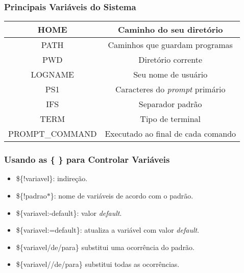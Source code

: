 \documentclass{beamer}
\begin{document}
   \begin{frame}
      \frametitle{Principais Variáveis do Sistema}
      \begin{table}
         \begin{tabular}{c|c}
         HOME  & Caminho do seu diretório\\
         \hline
         PATH  & Caminhos que guardam programas\\
         \hline 
         PWD  & Diretório corrente\\
         \hline
         LOGNAME & Seu nome de usuário \\
         \hline 
         PS1  & Caracteres do \textit{prompt} primário\\
         \hline 
         IFS  & Separador padrão\\
         \hline 
         TERM  & Tipo de terminal \\
         \hline 
	      PROMPT\_COMMAND & Executado ao final de cada comando \\
         \end{tabular}
      \end{table}
   \end{frame}


   \begin{frame}
      \frametitle{Usando as \{ \} para Controlar Variáveis}
      \begin{itemize}
         \item \$\{!variavel\}: indireção.
	      \item \$\{!padrao$*$\}: nome de variáveis de acordo com o padrão.
	      \item \$\{variavel:-default\}: valor \textit{default}.
	      \item \$\{variavel:=default\}: atualiza a variável com valor \textit{default}.
         \item \$\{variavel\slash de\slash para\} substitui uma ocorrência do padrão.
         \item \$\{variavel\slash\slash de\slash para\} substitui todas as ocorrências.
      \end{itemize}
   \end{frame}
 
\end{document}

